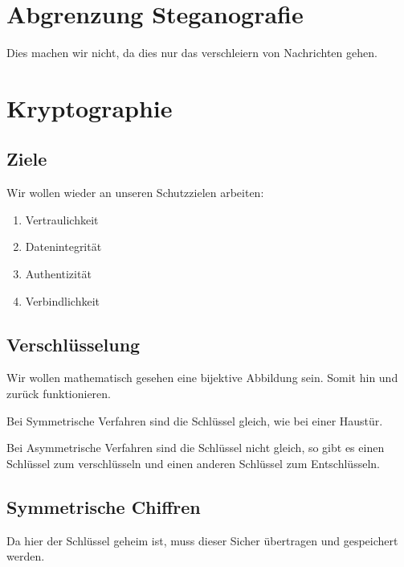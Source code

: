 \documentclass[a4paper]{article}
\title{\docTitle}
\author{Moritz}
\date{\today}
\begin{document}
\maketitle
\tableofcontents


\section{Abgrenzung Steganografie}

Dies machen wir nicht, da dies nur das verschleiern von Nachrichten gehen.

\section{Kryptographie}

\subsection{Ziele}

Wir wollen wieder an unseren Schutzzielen arbeiten:

\begin{enumerate}
    \item Vertraulichkeit
    \item Datenintegrität
    \item Authentizität
    \item Verbindlichkeit
\end{enumerate}

\subsection{Verschlüsselung}

Wir wollen mathematisch gesehen eine bijektive Abbildung sein. Somit hin und zurück funktionieren.

Bei Symmetrische Verfahren sind die Schlüssel gleich, wie bei einer Haustür.

Bei Asymmetrische Verfahren sind die Schlüssel nicht gleich, so gibt es einen Schlüssel zum verschlüsseln und einen anderen Schlüssel zum Entschlüsseln.

\subsection{Symmetrische Chiffren}

Da hier der Schlüssel geheim ist, muss dieser Sicher übertragen und gespeichert werden.
\end{document}
